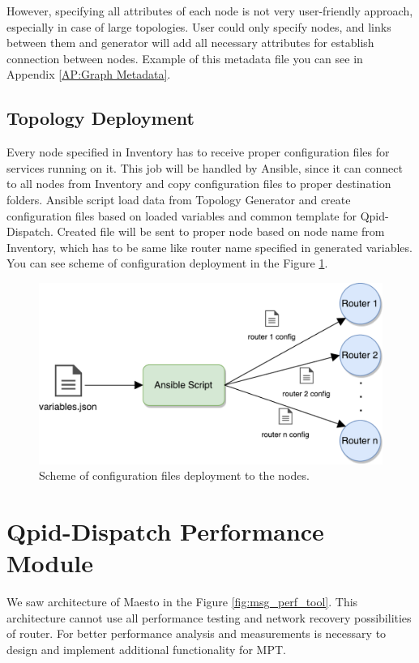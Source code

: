 However, specifying all attributes of each node is not very user-friendly approach, especially in case of large topologies. User could only specify nodes, and links between them and generator will add all necessary attributes for establish connection between nodes. Example of this metadata file you can see in Appendix \ref{AP:Graph Metadata}.

\subsection{Topology Deployment}
Every node specified in Inventory has to receive proper configuration files for services running on it. This job will be handled by Ansible, since it can connect to all nodes from Inventory and copy configuration files to proper destination folders. Ansible script load data from Topology Generator and create configuration files based on loaded variables and common template for Qpid-Dispatch. Created file will be sent to proper node based on node name from Inventory, which has to be same like router name specified in generated variables. You can see scheme of configuration deployment in the Figure \ref{fig:deployment}.

\begin{figure}[H]
  \centering
  \includegraphics[width=12cm]{obrazky-figures/deployment.pdf}
  \caption{Scheme of configuration files deployment to the nodes.}
  \label{fig:deployment}
\end{figure}


\section{Qpid-Dispatch Performance Module}
We saw architecture of Maesto in the Figure \ref{fig:msg_perf_tool}. This architecture cannot use all performance testing and network recovery possibilities of router. For better performance analysis and measurements is necessary to design and implement additional functionality for MPT.

